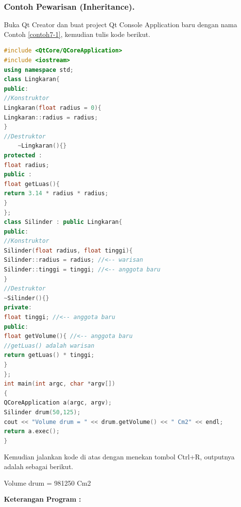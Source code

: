 \subsubsection*{Contoh Pewarisan (Inheritance).}

Buka Qt Creator dan buat project Qt Console Application baru dengan nama
Contoh \ref{contoh7-1}, kemudian tulis kode berikut.

\begin{lstlisting}[language=c++, caption=Pewarisan (Inheritance), label=contoh7-1]
#include <QtCore/QCoreApplication>
#include <iostream>
using namespace std;
class Lingkaran{
public:
//Konstruktor
Lingkaran(float radius = 0){
Lingkaran::radius = radius;
}
//Destruktor
    ~Lingkaran(){}
protected :
float radius;
public :
float getLuas(){
return 3.14 * radius * radius;
}
};
class Silinder : public Lingkaran{
public:
//Konstruktor
Silinder(float radius, float tinggi){
Silinder::radius = radius; //<-- warisan
Silinder::tinggi = tinggi; //<-- anggota baru
}
//Destruktor
~Silinder(){}
private:
float tinggi; //<-- anggota baru
public:
float getVolume(){ //<-- anggota baru
//getLuas() adalah warisan
return getLuas() * tinggi;
}
};
int main(int argc, char *argv[])
{
QCoreApplication a(argc, argv);
Silinder drum(50,125);
cout << "Volume drum = " << drum.getVolume() << " Cm2" << endl;
return a.exec();
}
\end{lstlisting}

Kemudian jalankan kode di atas dengan menekan tombol Ctrl+R, outputnya
adalah sebagai berikut.

\begin{lcverbatim}
Volume drum = 981250 Cm2
\end{lcverbatim}

\textbf{Keterangan Program :}

